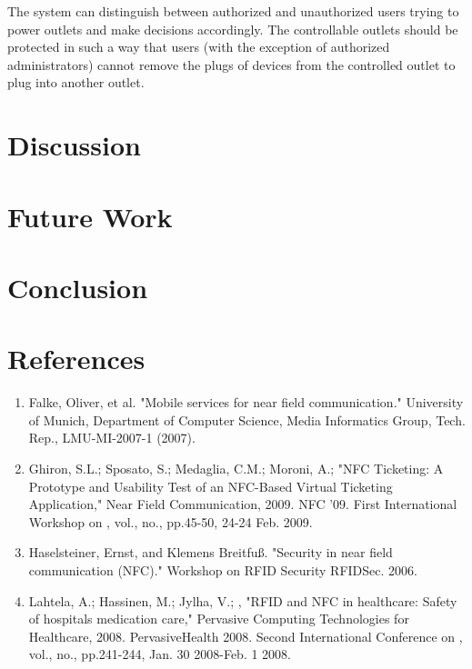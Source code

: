 \documentclass{sigchi}
\begin{document}
The system can distinguish between authorized and unauthorized users trying to power outlets and make decisions accordingly. 
The controllable outlets should be protected in such a way that users (with the exception of authorized administrators) cannot remove the plugs of devices from the controlled outlet to plug into another outlet.


\section{Discussion}


\section{Future Work}


\section{Conclusion}



\section{References}

\begin{enumerate}
\item Falke, Oliver, et al. "Mobile services for near field communication." University of Munich, Department of Computer Science, Media Informatics Group, Tech. Rep., LMU-MI-2007-1 (2007).

\item Ghiron, S.L.; Sposato, S.; Medaglia, C.M.; Moroni, A.; "NFC Ticketing: A Prototype and Usability Test of an NFC-Based Virtual Ticketing Application," Near Field Communication, 2009. NFC '09. First International Workshop on , vol., no., pp.45-50, 24-24 Feb. 2009.

\item Haselsteiner, Ernst, and Klemens Breitfuß. "Security in near field communication (NFC)." Workshop on RFID Security RFIDSec. 2006.

\item Lahtela, A.; Hassinen, M.; Jylha, V.; , "RFID and NFC in healthcare: Safety of hospitals medication care," Pervasive Computing Technologies for Healthcare, 2008. PervasiveHealth 2008. Second International Conference on , vol., no., pp.241-244, Jan. 30 2008-Feb. 1 2008.
\end{enumerate}
\end{document}
